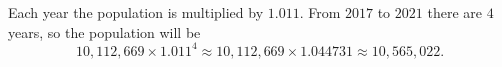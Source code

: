 Each year the population is multiplied by $1.011$. From $2017$ to $2021$ there are $4$ years, so the population will be
\[
10{,}112{,}669\times1.011^4\approx10{,}112{,}669\times1.044731\approx\boxed{10{,}565{,}022}.
\]
